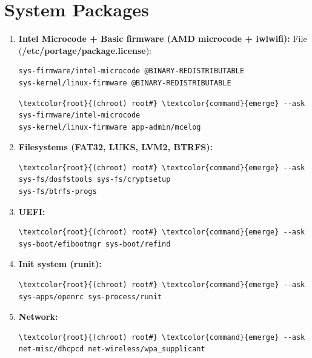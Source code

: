 \documentclass[10pt, a4paper, onecolumn, oneside, titlepage, openany]{book}
\begin{document}
\section{System Packages}
\begin{enumerate}
    \item \textbf{Intel Microcode + Basic firmware (AMD microcode + iwlwifi):}
\newline File (\textbf{\textcolor{file}{/etc/portage/package.license}}):
\begin{Verbatim}[commandchars=\\\{\}]
sys-firmware/intel-microcode @BINARY-REDISTRIBUTABLE
sys-kernel/linux-firmware @BINARY-REDISTRIBUTABLE
\end{Verbatim}
\begin{Verbatim}[commandchars=\\\{\}]
\textcolor{root}{(chroot) root#} \textcolor{command}{emerge} --ask sys-firmware/intel-microcode
sys-kernel/linux-firmware app-admin/mcelog
\end{Verbatim}
    \item \textbf{Filesystems (FAT32, LUKS, LVM2, BTRFS):}
\begin{Verbatim}[commandchars=\\\{\}]
\textcolor{root}{(chroot) root#} \textcolor{command}{emerge} --ask sys-fs/dosfstools sys-fs/cryptsetup
sys-fs/btrfs-progs
\end{Verbatim}
    \item \textbf{UEFI:}
\begin{Verbatim}[commandchars=\\\{\}]
\textcolor{root}{(chroot) root#} \textcolor{command}{emerge} --ask sys-boot/efibootmgr sys-boot/refind
\end{Verbatim}
    \item \textbf{Init system (runit):}
\begin{Verbatim}[commandchars=\\\{\}]
\textcolor{root}{(chroot) root#} \textcolor{command}{emerge} --ask sys-apps/openrc sys-process/runit
\end{Verbatim}
    \item \textbf{Network:}
\begin{Verbatim}[commandchars=\\\{\}]
\textcolor{root}{(chroot) root#} \textcolor{command}{emerge} --ask net-misc/dhcpcd net-wireless/wpa_supplicant
\end{Verbatim}
\end{enumerate}
\end{document}
